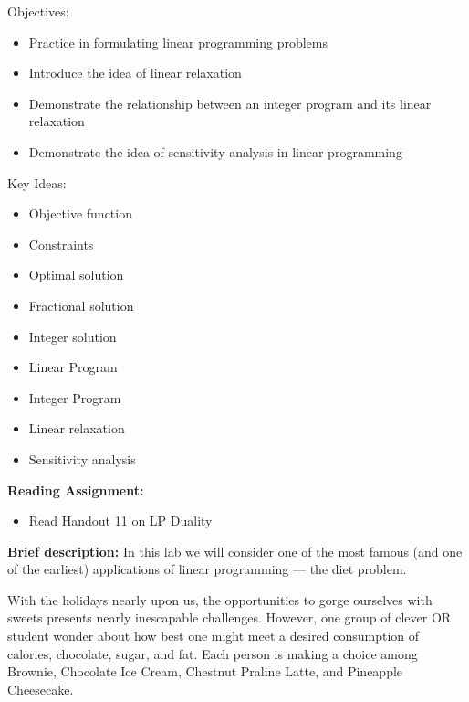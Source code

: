 \documentclass[twoside]{article}%
\begin{document}

Objectives:

\begin{itemize}
\item   Practice in formulating linear programming problems
\item   Introduce the idea of linear relaxation
\item   Demonstrate the relationship between an integer program and its linear relaxation
\item Demonstrate the idea of sensitivity analysis in linear programming
\end{itemize}

\noindent
Key Ideas:
\begin{itemize}
\item   Objective function
\item   Constraints
\item   Optimal solution
\item   Fractional solution
\item   Integer solution
\item 	Linear Program
\item 	Integer Program
\item   Linear relaxation
\item	Sensitivity analysis
\end{itemize}
\textbf{Reading Assignment:}
\begin{itemize}
\item
Read Handout 11 on LP Duality
\end{itemize}

\textbf{Brief description:}
In this lab we will consider one of the most famous (and one of the earliest) applications of linear programming --- the diet problem. 

\noindent
With the holidays nearly upon us, the opportunities to gorge ourselves with sweets presents nearly inescapable challenges. However, one group of clever OR student wonder about how best one might meet a desired consumption of calories, chocolate, sugar, and fat. Each person is making a choice among Brownie, Chocolate Ice Cream, Chestnut Praline Latte, and Pineapple Cheesecake.
\end{document}

